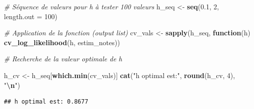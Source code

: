 \documentclass[
  12pt,
]{article}
\newenvironment{Shaded}{\begin{snugshade}}{\end{snugshade}}
\newcommand{\AttributeTok}[1]{\textcolor[rgb]{0.13,0.29,0.53}{#1}}
\newcommand{\CommentTok}[1]{\textcolor[rgb]{0.56,0.35,0.01}{\textit{#1}}}
\newcommand{\ControlFlowTok}[1]{\textcolor[rgb]{0.13,0.29,0.53}{\textbf{#1}}}
\newcommand{\DecValTok}[1]{\textcolor[rgb]{0.00,0.00,0.81}{#1}}
\newcommand{\FloatTok}[1]{\textcolor[rgb]{0.00,0.00,0.81}{#1}}
\newcommand{\FunctionTok}[1]{\textcolor[rgb]{0.13,0.29,0.53}{\textbf{#1}}}
\newcommand{\NormalTok}[1]{#1}
\newcommand{\OtherTok}[1]{\textcolor[rgb]{0.56,0.35,0.01}{#1}}
\newcommand{\SpecialCharTok}[1]{\textcolor[rgb]{0.81,0.36,0.00}{\textbf{#1}}}
\newcommand{\StringTok}[1]{\textcolor[rgb]{0.31,0.60,0.02}{#1}}
\begin{document}
\begin{Shaded}
\begin{Highlighting}[]
\CommentTok{\# Séquence de valeurs pour h à tester 100 valeurs}
\NormalTok{h\_seq }\OtherTok{\textless{}{-}} \FunctionTok{seq}\NormalTok{(}\FloatTok{0.1}\NormalTok{, }\DecValTok{2}\NormalTok{, }\AttributeTok{length.out =} \DecValTok{100}\NormalTok{) }

\CommentTok{\# Application de la fonction (output list)}
\NormalTok{cv\_vals }\OtherTok{\textless{}{-}} \FunctionTok{sapply}\NormalTok{(h\_seq, }\ControlFlowTok{function}\NormalTok{(h) }\FunctionTok{cv\_log\_likelihood}\NormalTok{(h, estim\_notes))}

\CommentTok{\# Recherche de la valeur optimale de h}

\NormalTok{h\_cv }\OtherTok{\textless{}{-}}\NormalTok{ h\_seq[}\FunctionTok{which.min}\NormalTok{(cv\_vals)]}
\FunctionTok{cat}\NormalTok{(}\StringTok{"h optimal est:"}\NormalTok{, }\FunctionTok{round}\NormalTok{(h\_cv, }\DecValTok{4}\NormalTok{), }\StringTok{"}\SpecialCharTok{\textbackslash{}n}\StringTok{"}\NormalTok{)}
\end{Highlighting}
\end{Shaded}

\begin{verbatim}
## h optimal est: 0.8677
\end{verbatim}
\end{document}
